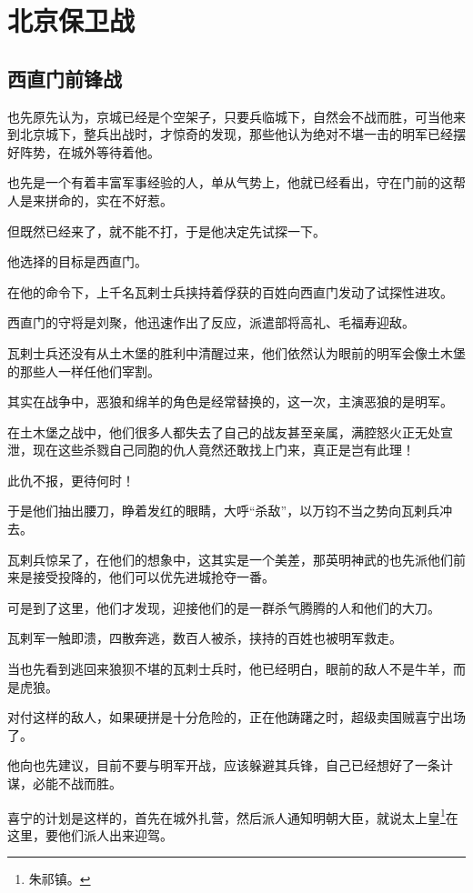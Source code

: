 \section{北京保卫战}
\ifnum{}
	\begin{multicols}{\theparacolNo}
\fi
\subsection{西直门前锋战}
也先原先认为，京城已经是个空架子，只要兵临城下，自然会不战而胜，可当他来到北京城下，整兵出战时，才惊奇的发现，那些他认为绝对不堪一击的明军已经摆好阵势，在城外等待着他。

也先是一个有着丰富军事经验的人，单从气势上，他就已经看出，守在门前的这帮人是来拼命的，实在不好惹。

但既然已经来了，就不能不打，于是他决定先试探一下。

他选择的目标是西直门。

在他的命令下，上千名瓦剌士兵挟持着俘获的百姓向西直门发动了试探性进攻。

西直门的守将是刘聚，他迅速作出了反应，派遣部将高礼、毛福寿迎敌。

瓦剌士兵还没有从土木堡的胜利中清醒过来，他们依然认为眼前的明军会像土木堡的那些人一样任他们宰割。

其实在战争中，恶狼和绵羊的角色是经常替换的，这一次，主演恶狼的是明军。

在土木堡之战中，他们很多人都失去了自己的战友甚至亲属，满腔怒火正无处宣泄，现在这些杀戮自己同胞的仇人竟然还敢找上门来，真正是岂有此理！

此仇不报，更待何时！

于是他们抽出腰刀，睁着发红的眼睛，大呼“杀敌”，以万钧不当之势向瓦剌兵冲去。

瓦剌兵惊呆了，在他们的想象中，这其实是一个美差，那英明神武的也先派他们前来是接受投降的，他们可以优先进城抢夺一番。

可是到了这里，他们才发现，迎接他们的是一群杀气腾腾的人和他们的大刀。

瓦剌军一触即溃，四散奔逃，数百人被杀，挟持的百姓也被明军救走。

当也先看到逃回来狼狈不堪的瓦剌士兵时，他已经明白，眼前的敌人不是牛羊，而是虎狼。

对付这样的敌人，如果硬拼是十分危险的，正在他踌躇之时，超级卖国贼喜宁出场了。

他向也先建议，目前不要与明军开战，应该躲避其兵锋，自己已经想好了一条计谋，必能不战而胜。

喜宁的计划是这样的，首先在城外扎营，然后派人通知明朝大臣，就说太上皇\footnote{朱祁镇。}在这里，要他们派人出来迎驾。


\end{multicols}

